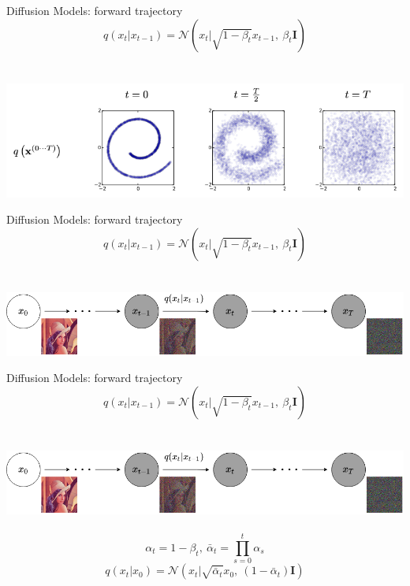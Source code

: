 \documentclass{beamer}
\begin{document}
\begin{frame}[t]{Diffusion Models: forward trajectory \cite{sohldickstein2015deep}}
    $$ q(x_t | x_{t-1}) = \mathcal{N}(x_t|\sqrt{1 - \beta_t} x_{t-1},\ \beta_t \mathbf{I}) $$ \\~\\
    \includegraphics[width=\textwidth]{../images/2022-03-17-diffusion_models_files/swiss_roll_noising.png}
\end{frame}

\begin{frame}[t]{Diffusion Models: forward trajectory \cite{sohldickstein2015deep}}
    $$ q(x_t | x_{t-1}) = \mathcal{N}(x_t|\sqrt{1 - \beta_t} x_{t-1},\ \beta_t \mathbf{I}) $$ \\~\\
    \includegraphics[width=\textwidth]{../images/2022-03-17-diffusion_models_files/noising.png}
\end{frame}

\begin{frame}[t]{Diffusion Models: forward trajectory \cite{sohldickstein2015deep}}
    $$ q(x_t | x_{t-1}) = \mathcal{N}(x_t|\sqrt{1 - \beta_t} x_{t-1},\ \beta_t \mathbf{I}) $$ \\~\\
    \includegraphics[width=\textwidth]{../images/2022-03-17-diffusion_models_files/noising.png} \\~\\
    $$ \alpha_t = 1 - \beta_t,~\bar{\alpha}_t = \prod\limits_{s=0}^t \alpha_s $$
    $$ q(x_t|x_0) = \mathcal{N}(x_t|\sqrt{\bar{\alpha}_t} x_0,\ (1 - \bar{\alpha}_t) \mathbf{I}) $$
\end{frame}
\end{document}
